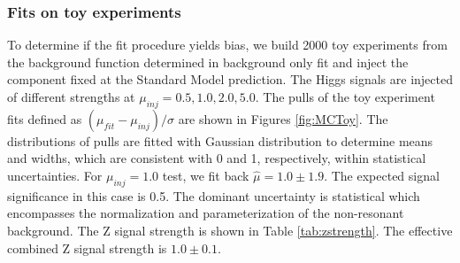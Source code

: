 




\subsubsection{Fits on toy experiments}

To determine if the fit procedure yields bias, we build 2000 toy experiments from the background function determined in background only fit and inject the \zjets{} component fixed at the Standard Model prediction. The Higgs signals are injected of different strengths at $\mu_{inj} = 0.5, 1.0, 2.0, 5.0$. The pulls of the toy experiment fits defined as $(\mu_{fit}-\mu_{inj})/ \sigma$ are shown in Figures \ref{fig:MCToy}. The distributions of pulls are fitted with Gaussian distribution to determine means and widths, which are consistent with 0 and 1, respectively, within statistical uncertainties. For $\mu_{inj}=1.0$ test, we fit back $\hat{\mu}=1.0\pm 1.9$. %
The expected signal significance in this case is 0.5. The dominant uncertainty is statistical which encompasses the normalization and parameterization of the non-resonant background. The Z signal strength is shown in Table \ref{tab:zstrength}. The effective combined Z signal strength is $1.0\pm 0.1$. %

